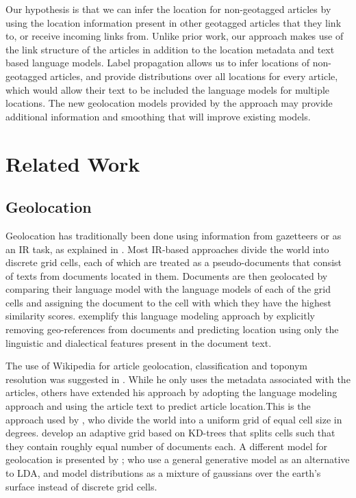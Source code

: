 \documentclass[11pt]{article}
\newcommand{\comment}[1]{}
\begin{document}
Our hypothesis is that we can infer the location for non-geotagged articles by using the location information present in other geotagged articles that they link to, or receive incoming links from. 
Unlike prior work, our approach makes use of the link structure of the articles in addition to the location metadata and text based language models. 
Label propagation allows us to infer locations of non-geotagged articles, and
provide distributions over all locations for every article, which would allow
their text to be included the language models for multiple locations.
The new geolocation models provided by the approach may provide additional information and smoothing that will improve existing models.

\section{Related Work}
\subsection{Geolocation}
Geolocation has traditionally been done \comment{improve this part} using information from gazetteers \cite{} or as an IR task, as explained in \cite{skiles:12}. 
Most IR-based approaches divide the world into discrete grid cells, each of which are treated as a pseudo-documents that consist of texts from documents located in them.
Documents are then geolocated by comparing their language model with the language models of each of the grid cells and assigning the document to the cell with which 
they have the highest similarity scores. \cite{eisenstein-smith-xing:11} exemplify this language modeling approach by explicitly removing geo-references from documents 
and predicting location using only the linguistic and dialectical features present in the document text.

The use of Wikipedia for article geolocation, classification and toponym resolution was suggested in \cite{Overall09}. 
While he only uses the metadata associated with the articles, others have extended his approach by adopting the language modeling approach and 
using the article text to predict article location.This is the approach used by \cite{wing-baldridge:11}, who divide the world into a uniform grid of equal cell size in degrees.
\cite{rolleretal:12} develop an adaptive grid based on KD-trees that splits cells such that they contain roughly equal number of documents each.
A different model for geolocation is presented by \cite{eisensteinetal:11}; who use a general generative model as an alternative to LDA, and model distributions 
as a mixture of gaussians over the earth's surface instead of discrete grid cells. 
\end{document}
